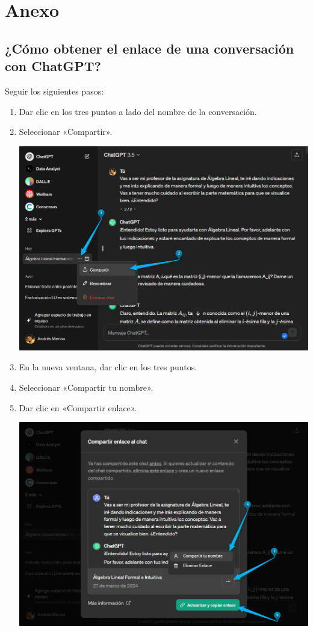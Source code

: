 \documentclass[a4,11pt]{aleph-notas}
\begin{document}
\section*{Anexo}

\subsection*{¿Cómo obtener el enlace de una conversación con ChatGPT?}

Seguir los siguientes pasos:
\begin{enumerate}
    \item Dar clic en los tres puntos a lado del nombre de la conversación.
    \item Seleccionar «Compartir».
    \begin{center}
        \includegraphics[width=0.85\linewidth]{fig01.png}
    \end{center}
    \item En la nueva ventana, dar clic en los tres puntos. 
    \item Seleccionar «Compartir tu nombre».
    \item Dar clic en «Compartir enlace».

    \begin{center}
        \includegraphics[width=0.85\linewidth]{fig02.png}
    \end{center}
\end{enumerate}
\end{document}
